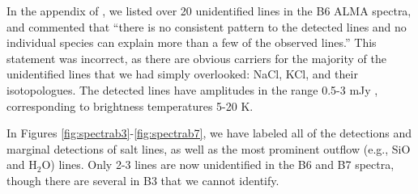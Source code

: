 \documentclass[twocolumn]{aastex62}
\begin{document}

In the appendix of \citet{Ginsburg2018b}, we listed over 20 unidentified 
lines in the B6 ALMA spectra, and commented that ``there is no
consistent pattern to the detected lines and no individual species can explain
more than a few of the observed lines.''  This statement was incorrect, as
there are obvious carriers for the majority of the unidentified lines that we
had simply overlooked: NaCl, KCl, and their isotopologues.  The
detected lines have amplitudes in the range 0.5-3 mJy \perbeam, corresponding
to brightness temperatures 5-20 K.  

In Figures \ref{fig:spectrab3}-\ref{fig:spectrab7}, we have labeled all of the
detections and marginal detections of salt lines, as well as the most
prominent outflow (e.g., SiO and H$_2$O) lines.  Only 2-3 lines are now
unidentified in the B6 and B7 spectra, though there are several in B3 that
we cannot identify.
\end{document}
